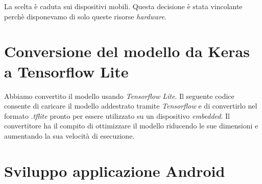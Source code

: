 La scelta è caduta sui dispositivi mobili. Questa decisione è stata vincolante perchè disponevamo di solo queste risorse \textit{hardware}.

\section{Conversione del modello da Keras a Tensorflow Lite}
Abbiamo convertito il modello usando \textit{Tensorflow Lite}. Il seguente codice consente di caricare il modello addestrato tramite \textit{Tensorflow} e di convertirlo nel formato .\textit{tflite} pronto per essere utilizzato su un dispositivo \textit{embedded}.
\vspace*{2ex}
Il convertitore ha il compito di ottimizzare il modello riducendo le sue dimensioni e aumentando la sua velocità di esecuzione.
\section{Sviluppo applicazione Android}
